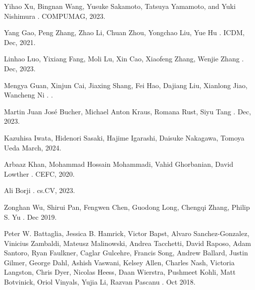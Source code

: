 \documentclass{report} %
\begin{document}
\begin{thebibliography}{00}
    \newblock Yihao Xu, Bingnan Wang, Yusuke Sakamoto, Tatsuya Yamamoto, and Yuki Nishimura
    .
    \newblock COMPUMAG, 2023.

    \newblock Yang Gao, Peng Zhang, Zhao Li, Chuan Zhou, Yongchao Liu, Yue Hu
    .
    \newblock ICDM, Dec, 2021.

    \newblock Linhao Luo, Yixiang Fang, Moli Lu, Xin Cao, Xiaofeng Zhang, Wenjie Zhang
    .
    \newblock Dec, 2023.

    \newblock Mengya Guan, Xinjun Cai, Jiaxing Shang, Fei Hao, Dajiang Liu, Xianlong Jiao, Wancheng Ni 
    .
    .

    \newblock Martin Juan José Bucher, Michael Anton Kraus, Romana Rust, Siyu Tang 
    .
    \newblock Dec, 2023.

    \newblock Kazuhisa Iwata, Hidenori Sasaki, Hajime Igarashi, Daisuke Nakagawa, Tomoya Ueda
     March, 2024.
    
    \newblock Arbaaz Khan, Mohammad Hossain Mohammadi, Vahid Ghorbanian, David Lowther
    .
    \newblock CEFC, 2020.

    \newblock Ali Borji
    .
    \newblock cs.CV, 2023.

    \newblock Zonghan Wu, Shirui Pan, Fengwen Chen, Guodong Long, Chengqi Zhang, Philip S. Yu
    .
     Dec 2019.

    \newblock Peter W. Battaglia, Jessica B. Hamrick, Victor Bapst, Alvaro Sanchez-Gonzalez, Vinicius Zambaldi, Mateusz Malinowski, Andrea Tacchetti, David Raposo, 
    Adam Santoro, Ryan Faulkner, Caglar Gulcehre, Francis Song, Andrew Ballard, Justin Gilmer, George Dahl, Ashish Vaswani, Kelsey Allen, Charles Nash,
    Victoria Langston, Chris Dyer, Nicolas Heess, Daan Wierstra, Pushmeet Kohli, Matt Botvinick, Oriol Vinyals, Yujia Li, Razvan Pascanu
    .
     Oct 2018.


\end{thebibliography}
\end{document}
